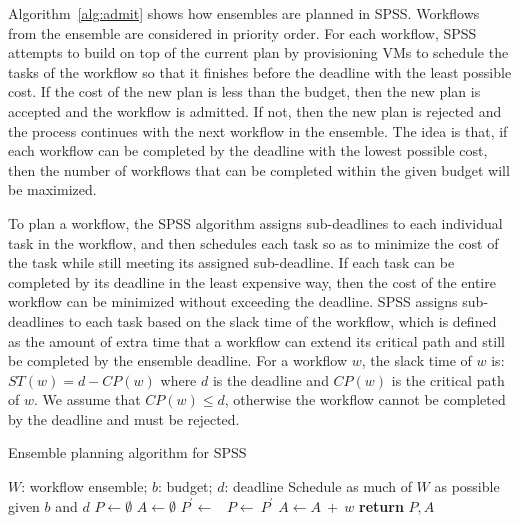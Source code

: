 \documentclass[conference]{IEEEtran}
\begin{document}
Algorithm~\ref{alg:admit} shows how ensembles are planned in SPSS. Workflows
from the ensemble are considered in priority order. For each workflow, SPSS
attempts to build on top of the current plan by provisioning VMs to schedule the
tasks of the workflow so that it finishes before the deadline with the least
possible cost. If the cost of the new plan is less than the budget, then the new
plan is accepted and the workflow is admitted. If not, then the new plan is
rejected and the process continues with the next workflow in the ensemble. The
idea is that, if each workflow can be completed by the
deadline with the lowest possible cost, then the number of workflows that can be
completed within the given budget will be maximized.

To plan a workflow, the SPSS algorithm assigns sub-deadlines to each individual
task in the workflow, and then schedules each task so as to minimize the cost of
the task while still meeting its assigned sub-deadline. If each task can be
completed by its deadline in the least expensive way, then the cost of the
entire workflow can be minimized without exceeding the deadline. SPSS assigns
sub-deadlines to each task based on the slack time of the workflow, which is
defined as the amount of extra time that a workflow can extend its critical path
and still be completed by the ensemble deadline. For a workflow $w$, the slack
time of $w$ is: $ ST(w) = d - CP(w) $
where $d$ is the deadline and $CP(w)$ is the critical path of $w$. We
assume that $CP(w) \leq d$, otherwise the workflow cannot be completed by the
deadline and must be rejected. 


\begin{algorithm}[tb]
\caption{Ensemble planning algorithm for SPSS}
\label{alg:admit}
{\footnotesize
\begin{algorithmic}[1]
\Require $W$: workflow ensemble; $b$: budget; $d$: deadline
\Ensure Schedule as much of $W$ as possible given $b$ and $d$
    \State $P\gets \emptyset$ 
    \State $A\gets \emptyset$ 
        \State $P^\prime \gets$\ 
            \State $P\gets\ P^\prime$ 
            \State $A \gets A\ +\ w$ 
        \EndIf
    \EndFor
    \State \textbf{return} $P,A$
\EndProcedure
\end{algorithmic}
}
\end{algorithm}
\end{document}
